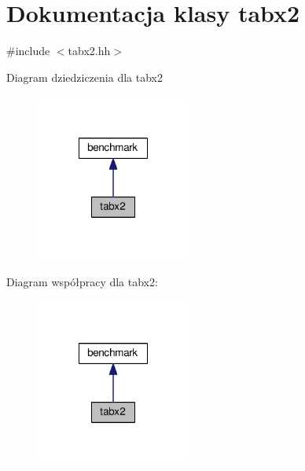 \hypertarget{classtabx2}{\section{Dokumentacja klasy tabx2}
\label{classtabx2}
}


{\ttfamily \#include $<$tabx2.\-hh$>$}



Diagram dziedziczenia dla tabx2\nopagebreak
\begin{figure}[H]
\begin{center}
\leavevmode
\includegraphics[width=144pt]{classtabx2__inherit__graph}
\end{center}
\end{figure}


Diagram współpracy dla tabx2\-:\nopagebreak
\begin{figure}[H]
\begin{center}
\leavevmode
\includegraphics[width=144pt]{classtabx2__coll__graph}
\end{center}
\end{figure}
